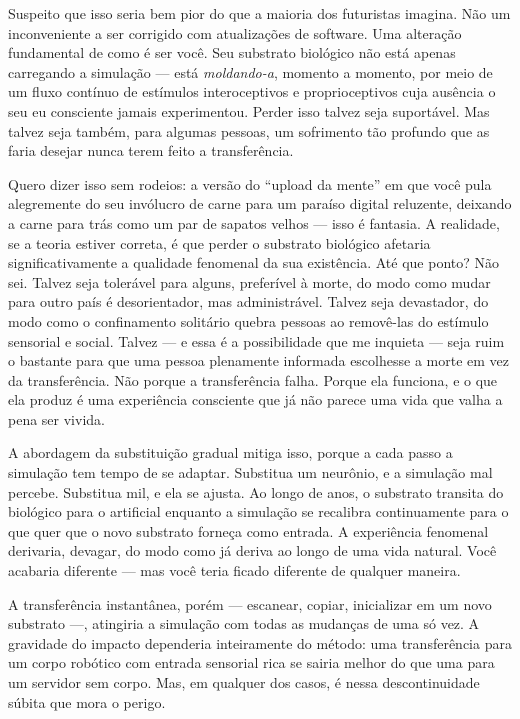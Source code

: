 \documentclass[11pt, twoside, openright]{book}
\begin{document}
Suspeito que isso seria bem pior do que a maioria dos futuristas imagina. Não um inconveniente a ser corrigido com atualizações de software. Uma alteração fundamental de como é ser você. Seu substrato biológico não está apenas carregando a simulação --- está \textit{moldando-a}, momento a momento, por meio de um fluxo contínuo de estímulos interoceptivos e proprioceptivos cuja ausência o seu eu consciente jamais experimentou. Perder isso talvez seja suportável. Mas talvez seja também, para algumas pessoas, um sofrimento tão profundo que as faria desejar nunca terem feito a transferência.

Quero dizer isso sem rodeios: a versão do ``upload da mente'' em que você pula alegremente do seu invólucro de carne para um paraíso digital reluzente, deixando a carne para trás como um par de sapatos velhos --- isso é fantasia. A realidade, se a teoria estiver correta, é que perder o substrato biológico afetaria significativamente a qualidade fenomenal da sua existência. Até que ponto? Não sei. Talvez seja tolerável para alguns, preferível à morte, do modo como mudar para outro país é desorientador, mas administrável. Talvez seja devastador, do modo como o confinamento solitário quebra pessoas ao removê-las do estímulo sensorial e social. Talvez --- e essa é a possibilidade que me inquieta --- seja ruim o bastante para que uma pessoa plenamente informada escolhesse a morte em vez da transferência. Não porque a transferência falha. Porque ela funciona, e o que ela produz é uma experiência consciente que já não parece uma vida que valha a pena ser vivida.

A abordagem da substituição gradual mitiga isso, porque a cada passo a simulação tem tempo de se adaptar. Substitua um neurônio, e a simulação mal percebe. Substitua mil, e ela se ajusta. Ao longo de anos, o substrato transita do biológico para o artificial enquanto a simulação se recalibra continuamente para o que quer que o novo substrato forneça como entrada. A experiência fenomenal derivaria, devagar, do modo como já deriva ao longo de uma vida natural. Você acabaria diferente --- mas você teria ficado diferente de qualquer maneira.

A transferência instantânea, porém --- escanear, copiar, inicializar em um novo substrato ---, atingiria a simulação com todas as mudanças de uma só vez. A gravidade do impacto dependeria inteiramente do método: uma transferência para um corpo robótico com entrada sensorial rica se sairia melhor do que uma para um servidor sem corpo. Mas, em qualquer dos casos, é nessa descontinuidade súbita que mora o perigo.
\end{document}
